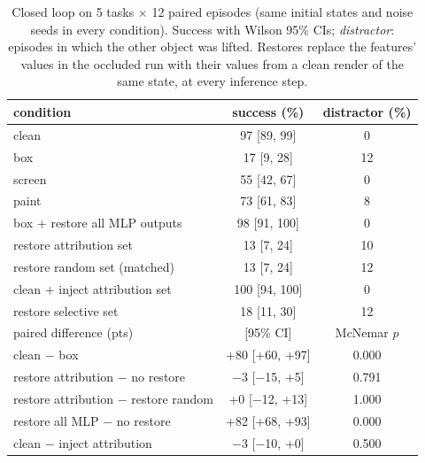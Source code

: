 \begin{table}[t]
\centering\small
\caption{Closed loop on 5 tasks $\times$ 12 paired episodes (same initial states and noise seeds in every condition). Success with Wilson 95\% CIs; \emph{distractor}: episodes in which the other object was lifted. Restores replace the features' values in the occluded run with their values from a clean render of the same state, at every inference step.}
\label{tab:closedloop}
\begin{tabular}{lcc}
\toprule
condition & success (\%) & distractor (\%) \\
\midrule
clean & 97 [89, 99] & 0 \\
box & 17 [9, 28] & 12 \\
screen & 55 [42, 67] & 0 \\
paint & 73 [61, 83] & 8 \\
box + restore all MLP outputs & 98 [91, 100] & 0 \\
restore attribution set & 13 [7, 24] & 10 \\
restore random set (matched) & 13 [7, 24] & 12 \\
clean + inject attribution set & 100 [94, 100] & 0 \\
restore selective set & 18 [11, 30] & 12 \\
\midrule
paired difference (pts) & [95\% CI] & McNemar $p$ \\
\midrule
clean $-$ box & +80 [+60, +97] & 0.000 \\
restore attribution $-$ no restore & $-$3 [$-$15, +5] & 0.791 \\
restore attribution $-$ restore random & +0 [$-$12, +13] & 1.000 \\
restore all MLP $-$ no restore & +82 [+68, +93] & 0.000 \\
clean $-$ inject attribution & $-$3 [$-$10, +0] & 0.500 \\
\bottomrule
\end{tabular}
\end{table}
